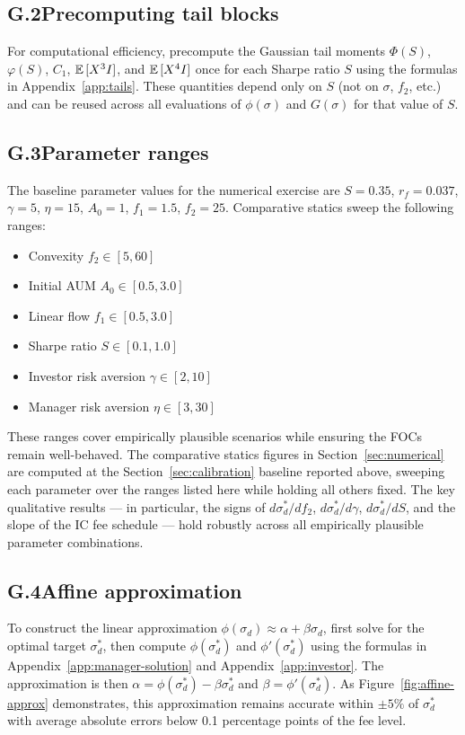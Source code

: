 \subsection*{G.2\quad Precomputing tail blocks}
For computational efficiency, precompute the Gaussian tail moments $\Phi(S)$, $\varphi(S)$, $C_1$, ${\mathbb{E}}\,[X^3 I]$, and ${\mathbb{E}}\,[X^4 I]$ once for each Sharpe ratio $S$ using the formulas in Appendix~\ref{app:tails}. These quantities depend only on $S$ (not on $\sigma$, $f_2$, etc.) and can be reused across all evaluations of $\phi(\sigma)$ and $G(\sigma)$ for that value of $S$.

\subsection*{G.3\quad Parameter ranges}
The baseline parameter values for the numerical exercise are $S=0.35$, $r_f=0.037$, $\gamma=5$, $\eta=15$, $A_0=1$, $f_1=1.5$, $f_2=25$. Comparative statics sweep the following ranges:
\begin{itemize}
\item Convexity $f_2 \in [5, 60]$
\item Initial AUM $A_0 \in [0.5, 3.0]$
\item Linear flow $f_1 \in [0.5, 3.0]$
\item Sharpe ratio $S \in [0.1, 1.0]$
\item Investor risk aversion $\gamma \in [2, 10]$
\item Manager risk aversion $\eta \in [3, 30]$
\end{itemize}
These ranges cover empirically plausible scenarios while ensuring the FOCs remain well-behaved. The comparative statics figures in Section~\ref{sec:numerical} are computed at the Section~\ref{sec:calibration} baseline reported above, sweeping each parameter over the ranges listed here while holding all others fixed. The key qualitative results --- in particular, the signs of $d\sigma_d^*/df_2$, $d\sigma_d^*/d\gamma$, $d\sigma_d^*/dS$, and the slope of the IC fee schedule --- hold robustly across all empirically plausible parameter combinations.

\subsection*{G.4\quad Affine approximation}
To construct the linear approximation $\phi(\sigma_d) \approx \alpha + \beta\sigma_d$, first solve for the optimal target $\sigma_d^*$, then compute $\phi(\sigma_d^*)$ and $\phi'(\sigma_d^*)$ using the formulas in Appendix~\ref{app:manager-solution} and Appendix~\ref{app:investor}. The approximation is then $\alpha = \phi(\sigma_d^*) - \beta\sigma_d^*$ and $\beta = \phi'(\sigma_d^*)$. As Figure~\ref{fig:affine-approx} demonstrates, this approximation remains accurate within $\pm 5\%$ of $\sigma_d^*$ with average absolute errors below 0.1 percentage points of the fee level.
